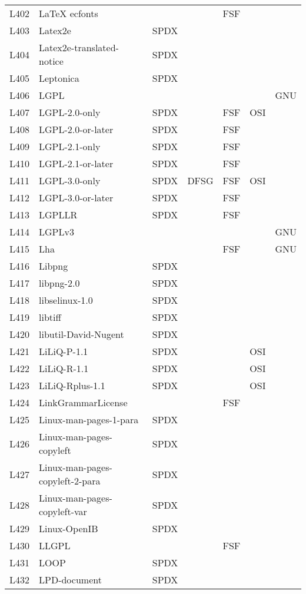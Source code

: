 \begin{longtable}[h]{m{2cm} | m{7cm} | c | c | c | c | c}
  L402 & LaTeX ecfonts &  &  & FSF &  &  \\
  L403 & Latex2e & SPDX &  &  &  &  \\
  L404 & Latex2e-translated-notice & SPDX &  &  &  &  \\
  L405 & Leptonica & SPDX &  &  &  &  \\
  L406 & LGPL &  &  &  &  & GNU \\
  L407 & LGPL-2.0-only & SPDX &  & FSF & OSI &  \\
  L408 & LGPL-2.0-or-later & SPDX &  & FSF &  &  \\
  L409 & LGPL-2.1-only & SPDX &  & FSF &  &  \\
  L410 & LGPL-2.1-or-later & SPDX &  & FSF &  &  \\
  L411 & LGPL-3.0-only & SPDX & DFSG & FSF & OSI &  \\
  L412 & LGPL-3.0-or-later & SPDX &  & FSF &  &  \\
  L413 & LGPLLR & SPDX &  & FSF &  &  \\
  L414 & LGPLv3 &  &  &  &  & GNU \\
  L415 & Lha &  &  & FSF &  & GNU \\
  L416 & Libpng & SPDX &  &  &  &  \\
  L417 & libpng-2.0 & SPDX &  &  &  &  \\
  L418 & libselinux-1.0 & SPDX &  &  &  &  \\
  L419 & libtiff & SPDX &  &  &  &  \\
  L420 & libutil-David-Nugent & SPDX &  &  &  &  \\
  L421 & LiLiQ-P-1.1 & SPDX &  &  & OSI &  \\
  L422 & LiLiQ-R-1.1 & SPDX &  &  & OSI &  \\
  L423 & LiLiQ-Rplus-1.1 & SPDX &  &  & OSI &  \\
  L424 & LinkGrammarLicense &  &  & FSF &  &  \\
  L425 & Linux-man-pages-1-para & SPDX &  &  &  &  \\
  L426 & Linux-man-pages-copyleft & SPDX &  &  &  &  \\
  L427 & Linux-man-pages-copyleft-2-para & SPDX &  &  &  &  \\
  L428 & Linux-man-pages-copyleft-var & SPDX &  &  &  &  \\
  L429 & Linux-OpenIB & SPDX &  &  &  &  \\
  L430 & LLGPL &  &  & FSF &  &  \\
  L431 & LOOP & SPDX &  &  &  &  \\
  L432 & LPD-document & SPDX &  &  &  &  \\

\end{longtable}
